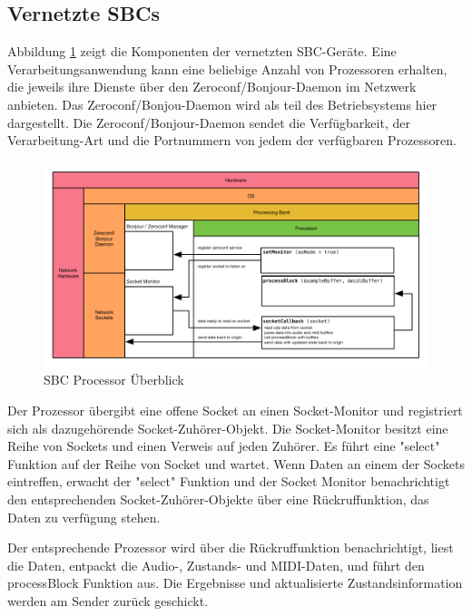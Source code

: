 \subsection{Vernetzte SBCs}

Abbildung \ref{fig:arch_03} zeigt die Komponenten der vernetzten SBC-Geräte. Eine Verarbeitungsanwendung kann eine beliebige Anzahl von Prozessoren erhalten, die jeweils ihre Dienste über den Zeroconf/Bonjour-Daemon im Netzwerk anbieten. Das Zeroconf/Bonjou-Daemon wird als teil des Betriebsystems hier dargestellt. Die Zeroconf/Bonjour-Daemon sendet die Verfügbarkeit, der Verarbeitung-Art und die Portnummern von jedem der verfügbaren Prozessoren.

\begin{figure}[H]
    \centering
    \includegraphics[width=\textwidth]{assets/architecture_03.pdf}
    \caption{SBC Processor Überblick}
    \label{fig:arch_03}
\end{figure}

Der Prozessor übergibt eine offene Socket an einen Socket-Monitor und registriert sich als dazugehörende Socket-Zuhörer-Objekt. Die Socket-Monitor besitzt eine Reihe von Sockets und einen Verweis auf jeden Zuhörer. Es führt eine "select" Funktion auf der Reihe von Socket und wartet. Wenn Daten an einem der Sockets eintreffen, erwacht der "select" Funktion und der Socket Monitor benachrichtigt den entsprechenden Socket-Zuhörer-Objekte über eine Rückruffunktion, das Daten zu verfügung stehen.

Der entsprechende Prozessor wird über die Rückruffunktion benachrichtigt, liest die Daten, entpackt die Audio-, Zustands- und MIDI-Daten, und führt den processBlock Funktion aus. Die Ergebnisse und aktualisierte Zustandsinformation werden am Sender zurück geschickt.

